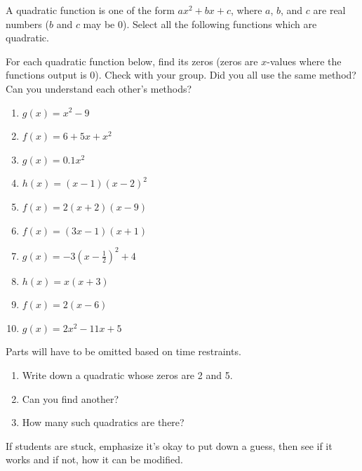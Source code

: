 \documentclass[noauthor]{ximera}
\begin{document}
\begin{problem}
A quadratic function is one of the form \(ax^2 + bx + c\), where \(a\),
\(b\), and \(c\) are real numbers (\(b\) and \(c\) may be 0). Select all the 
following functions which are quadratic. 

For each quadratic function below, find its zeros (zeros are 
\(x\)-values where the functions output is 0). Check with your group.
Did you all use the same method? Can you understand each other's methods?

\begin{enumerate}
    \item \(g\left(x\right)=x^2-9\)
    \item \(f\left(x\right)=6+5x+x^2\)
    \item \(g\left(x\right)=0.1x^2\)
    \item \(h\left(x\right)=\left(x-1\right)\left(x-2\right)^2\)
    \item \(f\left(x\right)=2\left(x+2\right)\left(x-9\right)\)
    \item \(f\left(x\right)=\left(3x-1\right)\left(x+1\right)\)
    \item \(g\left(x\right)=-3\left(x-\frac{1}{2}\right)^2+4\)
    \item \(h\left(x\right)=x\left(x+3\right)\)
    \item \(f\left(x\right)=2\left(x-6\right)\)
    \item \(g\left(x\right)=2x^2-11x+5\)
\end{enumerate}

\begin{instructorNotes}
Parts will have to be omitted based on time restraints.
\end{instructorNotes}

\end{problem}

\begin{problem}

\begin{enumerate}
    \item Write down a quadratic whose zeros are 2 and 5.
    \item Can you find another?
    \item How many such quadratics are there?
\end{enumerate}

\begin{instructorNotes}
If students are stuck, emphasize it's okay to put down a guess, then
see if it works and if not, how it can be modified.
\end{instructorNotes}

\end{problem}
\end{document}
